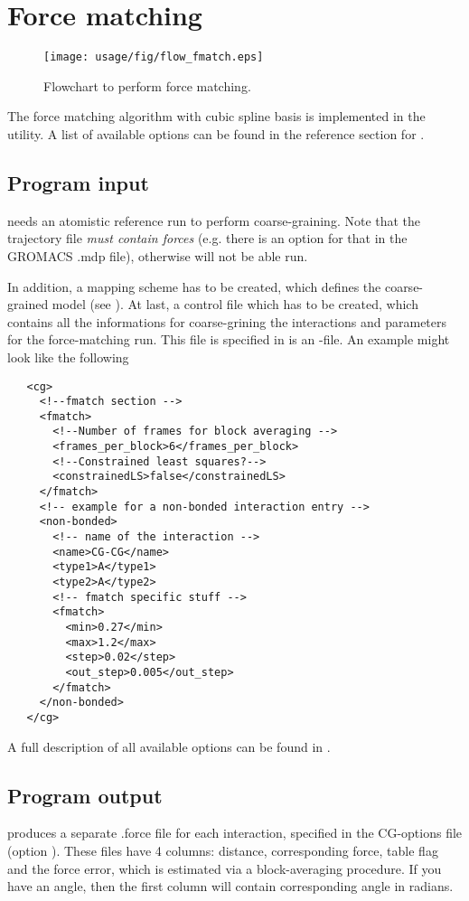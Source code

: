 \chapter{Force matching}
\begin{figure}
   \centering
   \texttt{[image: usage/fig/flow\_fmatch.eps]}
   \caption{Flowchart to perform force matching.}
\end{figure}
The force matching algorithm with cubic spline basis is implemented in the  utility. A list of available options can be found in the reference section for .

\section{Program input}
 needs an atomistic reference run to perform coarse-graining. Note that the trajectory file {\em must contain forces } (e.g. there is an option for that in the GROMACS .mdp file), otherwise  will not be able run.

In addition, a mapping scheme has to be created, which defines the coarse-grained model (see ). At last, a control file which has to be created, which contains all the informations for coarse-grining the interactions and parameters for the force-matching run. This file is specified in  is an \xml-file. An example might look like the following
\begin{lstlisting}
   <cg>
     <!--fmatch section -->
     <fmatch>
       <!--Number of frames for block averaging -->
       <frames_per_block>6</frames_per_block>
       <!--Constrained least squares?-->
       <constrainedLS>false</constrainedLS>
     </fmatch>
     <!-- example for a non-bonded interaction entry -->
     <non-bonded>
       <!-- name of the interaction -->
       <name>CG-CG</name>
       <type1>A</type1>
       <type2>A</type2>
       <!-- fmatch specific stuff -->
       <fmatch>
         <min>0.27</min>
         <max>1.2</max>
         <step>0.02</step>
         <out_step>0.005</out_step>
       </fmatch>
     </non-bonded>
   </cg>
\end{lstlisting}
A full description of all available options can be found in .

\section{Program output}
 produces a separate .force file for each interaction, specified in the CG-options file (option  ).
These files have 4 columns: distance, corresponding force, table flag and the force error, which is estimated via a block-averaging procedure.
If you have an angle, then the first column will contain corresponding angle in radians.

